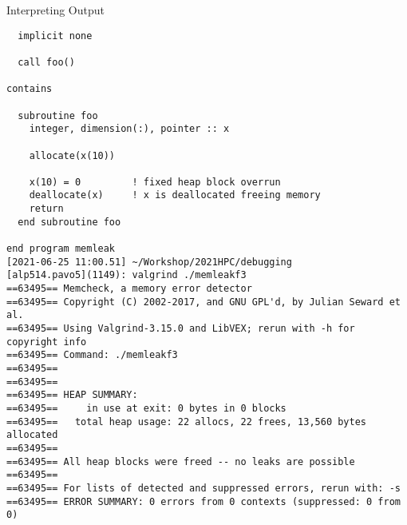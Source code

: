 \documentclass[10pt,t]{beamer}
\begin{document}
\begin{frame}{Interpreting Output}
\begin{itemize}
\begin{lstlisting}
  implicit none

  call foo()

contains

  subroutine foo
    integer, dimension(:), pointer :: x

    allocate(x(10))

    x(10) = 0         ! fixed heap block overrun
    deallocate(x)     ! x is deallocated freeing memory
    return
  end subroutine foo

end program memleak
[2021-06-25 11:00.51] ~/Workshop/2021HPC/debugging
[alp514.pavo5](1149): valgrind ./memleakf3
==63495== Memcheck, a memory error detector
==63495== Copyright (C) 2002-2017, and GNU GPL'd, by Julian Seward et al.
==63495== Using Valgrind-3.15.0 and LibVEX; rerun with -h for copyright info
==63495== Command: ./memleakf3
==63495==
==63495==
==63495== HEAP SUMMARY:
==63495==     in use at exit: 0 bytes in 0 blocks
==63495==   total heap usage: 22 allocs, 22 frees, 13,560 bytes allocated
==63495==
==63495== All heap blocks were freed -- no leaks are possible
==63495==
==63495== For lists of detected and suppressed errors, rerun with: -s
==63495== ERROR SUMMARY: 0 errors from 0 contexts (suppressed: 0 from 0)
        \end{lstlisting}
  \end{itemize}
\end{frame}
\end{document}
